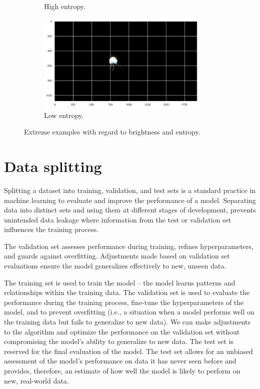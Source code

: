 \documentclass[Master,MDS,english]{BASE/twbook} %
\begin{document}
\begin{figure}
\begin{subfigure}[t]{.5\textwidth}
  \caption{High entropy.}
  \label{railsem_sub3}
\end{subfigure}%
\begin{subfigure}[t]{.5\textwidth}
  \centering
  \includegraphics[width=0.9\textwidth]{images/datasets/railsem/example_low_entropy}
  \caption{Low entropy.}
  \label{railsem_sub4}
\end{subfigure}
\caption{Extreme examples with regard to brightness and entropy.}
\label{fig:examples}
\end{figure}


\section{Data splitting}

Splitting a dataset into training, validation, and test sets is a standard practice in machine learning to evaluate and improve the performance of a model. 
 Separating data into distinct sets and using them at different stages of development, prevents unintended data leakage where information from the test or validation set influences the training process.
 
 The validation set assesses performance during training, refines hyperparameters, and guards against overfitting. Adjustments made based on validation set evaluations ensure the model generalizes effectively to new, unseen data. 

The training set is used to train the model -- the model learns patterns and relationships within the training data.
The validation set is used to evaluate the performance during the training process, fine-tune the hyperparameters of the model, and to prevent overfitting (i.e., a situation when a model performs well on the training data but fails to generalize to new data). We can make adjustments to the algorithm and optimize the performance on the validation set without compromising the model's ability to generalize to new data. 
The test set is reserved for the final evaluation of the model. The test set allows for an unbiased assessment of the model's performance on data it has never seen before and provides, therefore, an estimate of how well the model is likely to perform on new, real-world data.
\end{document}

